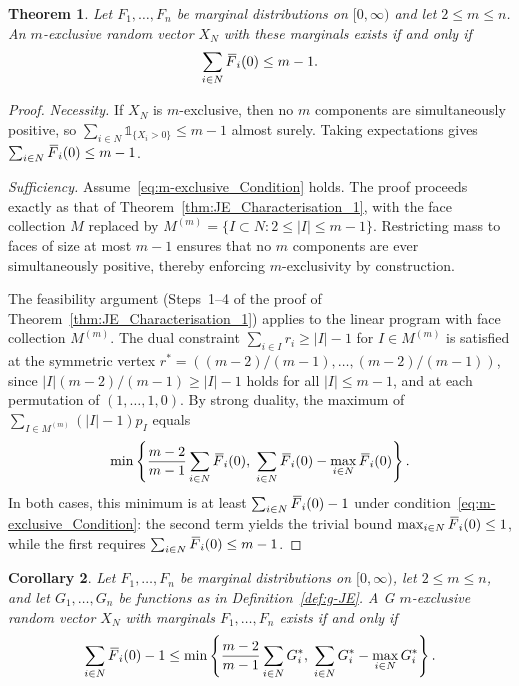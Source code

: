 \documentclass[letterpaper,12pt]{article}
\numberwithin{equation}{section}
\newtheorem{theorem}{Theorem}[section]
\newtheorem{corollary}[theorem]{Corollary}
\newcommand{\N}{{N}}
\newcommand{\M}{{M}}
\newcommand{\I}{{I}}
\newcommand{\F}{\,\overline{\kern-0.175em F\kern-0em}}
\begin{document}
{\begin{theorem}
\label{thm:m-exclusivity}
Let $F_1,\dots,F_n$ be marginal distributions on $[0,\infty)$ and let
$2\le m\le n$. An $m$-exclusive random vector $X_{\N}$ with these marginals
exists if and only if
\begin{equation}
\label{eq:m-exclusive_Condition}
\sum_{i\in\N}\F_i(0)\le m-1.
\end{equation}
\end{theorem}

\begin{proof}
\textit{Necessity.}
If $X_\N$ is $m$-exclusive, then no $m$ components are simultaneously positive,
so $\sum_{i\in\N}\mathds{1}_{\{X_i>0\}}\le m-1$ almost surely. Taking expectations
gives $\sum_{i\in\N}\F_i(0)\le m-1$.

\medskip
\noindent\textit{Sufficiency.}
Assume~\eqref{eq:m-exclusive_Condition} holds. The proof proceeds exactly as
that of Theorem~\ref{thm:JE_Characterisation_1}, with the face collection
$\M$ replaced by $\M^{(m)}=\{I\subset\N:2\le|I|\le m-1\}$. Restricting mass
to faces of size at most $m-1$ ensures that no $m$ components are ever
simultaneously positive, thereby enforcing $m$-exclusivity by construction.

The feasibility argument (Steps~1--4 of the proof of
Theorem~\ref{thm:JE_Characterisation_1}) applies to the linear program
with face collection $\M^{(m)}$. The dual constraint $\sum_{i\in\I}r_i\ge|\I|-1$
for $\I\in\M^{(m)}$ is satisfied at the symmetric vertex
$r^*=((m-2)/(m-1),\dots,(m-2)/(m-1))$, since $|\I|(m-2)/(m-1)\ge|\I|-1$ holds
for all $|\I|\le m-1$, and at each permutation of $(1,\dots,1,0)$. By strong
duality, the maximum of $\sum_{\I\in\M^{(m)}}(|\I|-1)p_\I$ equals
\[
\min\left\{\frac{m-2}{m-1}\sum_{i\in\N}\F_i(0),\;
\sum_{i\in\N}\F_i(0)-\max_{i\in\N}\F_i(0)\right\}.
\]
In both cases, this minimum is at least $\sum_{i\in\N}\F_i(0)-1$ under
condition~\eqref{eq:m-exclusive_Condition}: the second term yields the trivial
bound $\max_{i\in\N}\F_i(0)\le1$, while the first requires
$\sum_{i\in\N}\F_i(0)\le m-1$.
\end{proof}

\begin{corollary}
\label{cor:m_exclusive_G_star}
Let $F_1,\dots,F_n$ be marginal distributions on $[0,\infty)$, let $2\le m\le n$,
and let $G_1,\dots,G_n$ be functions as in Definition~\ref{def:g-JE}. A G
$m$-exclusive random vector $X_\N$ with marginals $F_1,\dots,F_n$ exists if and
only if
\begin{equation}
\label{eq:G-m-exclusive_Condition}
\sum_{i\in\N}\F_i(0)-1
\le\min\left\{
\frac{m-2}{m-1}\sum_{i\in\N}G_i^*,\;
\sum_{i\in\N}G_i^*-\max_{i\in\N}G_i^*
\right\}.
\end{equation}
\end{corollary}

}
\end{document}
